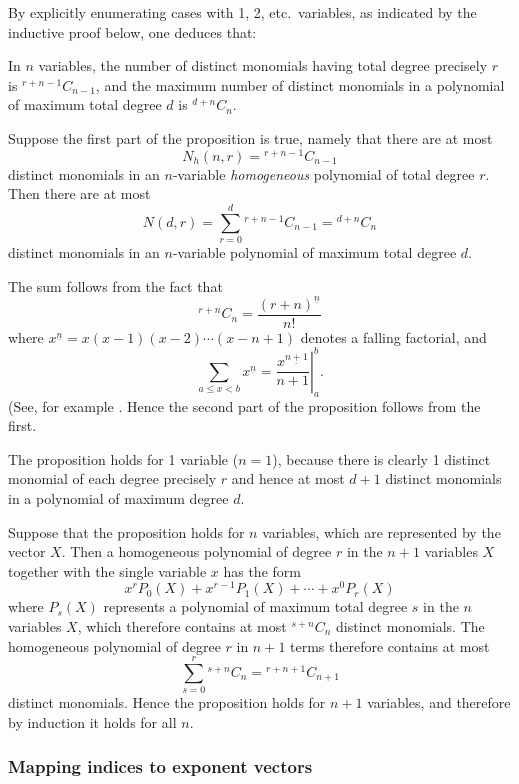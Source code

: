 By explicitly enumerating cases with 1, 2, etc.\ variables, as
indicated by the inductive proof below, one deduces that:

\begin{prop}
  In $n$ variables, the number of distinct monomials having total
  degree precisely $r$ is $^{r+n-1}C_{n-1}$, and the maximum number of
  distinct monomials in a polynomial of maximum total degree $d$ is
  $^{d+n}C_n$.
\end{prop}

\begin{randpproof}
  Suppose the first part of the proposition is true, namely that there
  are at most
  \[
    N_h(n,r) = {}^{r+n-1}C_{n-1}
  \]
  distinct monomials in an $n$-variable \emph{homogeneous\/}
  polynomial of total degree $r$.  Then there are at most
  \[
    N(d,r) = \sum_{r=0}^d {}^{r+n-1}C_{n-1} = {}^{d+n}C_n
  \]
  distinct monomials in an $n$-variable polynomial of maximum total
  degree $d$.

  The sum follows from the fact that
  \[
    {}^{r+n}C_n = \frac{(r+n)^{\underline n}}{n!}
  \]
  where $x^{\underline n} = x(x-1)(x-2)\cdots(x-n+1)$ denotes a
  falling factorial, and
  \[
    \sum_{a \leq x < b} x^{\underline n} =
    \left. \frac{x^{\underline{n+1}}}{n+1} \right|_a^b.
  \]
  (See, for example \cite[equation (1.37)]{GreenHarper:1982}.
  Hence the second part of the proposition follows
  from the first.

  The proposition holds for 1 variable ($n = 1$), because there is
  clearly 1 distinct monomial of each degree precisely $r$ and hence
  at most $d+1$ distinct monomials in a polynomial of maximum degree
  $d$.

  Suppose that the proposition holds for $n$ variables, which are
  represented by the vector $X$.  Then a homogeneous polynomial of
  degree $r$ in the $n+1$ variables $X$ together with the single
  variable $x$ has the form
  \[
    x^r P_0(X) + x^{r-1} P_1(X) + \cdots + x^0 P_r(X)
  \]
  where $P_s(X)$ represents a polynomial of maximum total degree $s$
  in the $n$ variables $X$, which therefore contains at most
  $^{s+n}C_n$ distinct monomials.  The homogeneous polynomial of
  degree $r$ in $n+1$ terms therefore contains at most
  \[
    \sum_{s=0}^r {}^{s+n}C_n = {}^{r+n+1}C_{n+1}
  \]
  distinct monomials.
  Hence the proposition holds for $n+1$ variables, and therefore by
  induction it holds for all $n$.
\end{randpproof}


\subsubsection{Mapping indices to exponent vectors}


